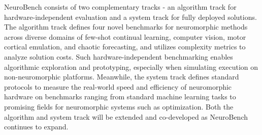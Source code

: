 NeuroBench consists of two complementary tracks - an algorithm track for hardware-independent evaluation and a system track for fully deployed solutions. 
The algorithm track defines four novel benchmarks for neuromorphic methods across diverse domains of few-shot continual learning, computer vision, motor cortical emulation, and chaotic forecasting, and utilizes complexity metrics to analyze solution costs. Such hardware-independent benchmarking enables algorithmic exploration and prototyping, especially when simulating execution on non-neuromorphic platforms. Meanwhile, the system track defines standard protocols to measure the real-world speed and efficiency of neuromorphic hardware on benchmarks ranging from standard machine learning tasks to promising fields for neuromorphic systems such as optimization.
Both the algorithm and system track will be extended and co-developed as NeuroBench continues to expand.



